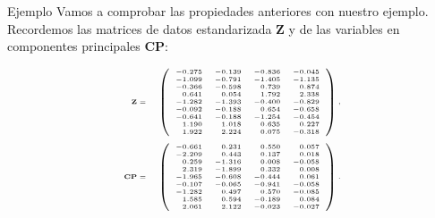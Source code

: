 \documentclass[
  spanish,
  ignorenonframetext,
]{beamer}
\begin{document}
\begin{frame}{Ejemplo}
\protect\hypertarget{ejemplo-16}{}
Vamos a comprobar las propiedades anteriores con nuestro ejemplo.
Recordemos las matrices de datos estandarizada \(\mathbf{Z}\) y de las
variables en componentes principales \(\mathbf{CP}\):

\[
{\tiny 
\begin{array}{rl}
\mathbf{Z}= & 
\left(
\begin{array}{rrrr}
-0.275 & -0.139 & -0.836 & -0.045 \\
 -1.099 & -0.791 & -1.405 & -1.135 \\
 -0.366 & -0.598 & 0.739 & 0.874 \\
 0.641 & 0.054 & 1.792 & 2.338 \\
 -1.282 & -1.393 & -0.400 & -0.829 \\
 -0.092 & -0.188 & 0.654 & -0.658 \\
 -0.641 & -0.188 & -1.254 & -0.454 \\
 1.190 & 1.018 & 0.635 & 0.227 \\
 1.922 & 2.224 & 0.075 & -0.318 
\end{array}
\right),
\\ &  \\
\mathbf{CP} = &
\left(
\begin{array}{rrrr}
-0.661 & 0.231 & 0.550 & 0.057 \\
 -2.209 & 0.443 & 0.137 & 0.018 \\
 0.259 & -1.316 & 0.008 & -0.058 \\
 2.319 & -1.899 & 0.332 & 0.008 \\
 -1.965 & -0.608 & -0.444 & 0.061 \\
 -0.107 & -0.065 & -0.941 & -0.058 \\
 -1.282 & 0.497 & 0.570 & -0.085 \\
 1.585 & 0.594 & -0.189 & 0.084 \\
 2.061 & 2.122 & -0.023 & -0.027 
\end{array}
\right).
\end{array}}
\]
\end{frame}
\end{document}
